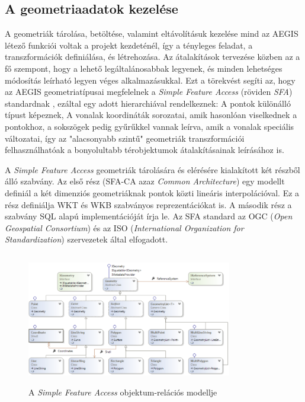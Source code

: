 \subsection{A geometriaadatok kezelése}
A geometriák tárolása, betöltése, valamint eltávolításuk kezelése mind az AEGIS létező funkciói voltak a projekt kezdeténél, így a tényleges feladat, a transzformációk definiálása, és létrehozása.
Az átalakítások tervezése közben az a fő szempont, hogy a lehető legáltalánosabbak legyenek, és minden lehetséges módosítás leírható legyen véges alkalmazásukkal. Ezt a törekvést segíti az, hogy az AEGIS geometriatípusai megfelelnek a \emph{Simple Feature Access} (röviden \emph{SFA}) standardnak \cite{sfa}, ezáltal egy adott hierarchiával rendelkeznek: A pontok különálló típust képeznek, A vonalak koordináták sorozatai, amik hasonlóan viselkednek a pontokhoz, a sokszögek pedig gyűrűkkel vannak leírva, amik a vonalak speciális változatai, így az "alacsonyabb szintű" geometriák transzformációi felhasználhatóak a bonyolultabb térobjektumok átalakításainak leírásához is.
\begin{note}
A \textit{Simple Feature Access} geometriák tárolására és elérésére kialakított két részből álló szabvány. Az első rész (SFA-CA azaz \textit{Common Architecture}) egy modellt definiál a két dimenziós geometriáknak pontok közti lineáris interpolációval. Ez a rész definiálja WKT és WKB szabványos reprezentációkat is. A második rész a szabvány SQL alapú implementációját írja le. Az SFA standard az OGC (\textit{Open Geospatial Consortium}) és az ISO (\textit{International Organization for Standardization}) szervezetek által elfogadott.
\begin{figure}[H]
	\centering
	\includegraphics[width=0.8\textwidth,height=220px]{images/sfa.png}
	\caption{A \textit{Simple Feature Access} objektum-relációs modellje}
	\label{fig:picture-8}
\end{figure}
\end{note}

